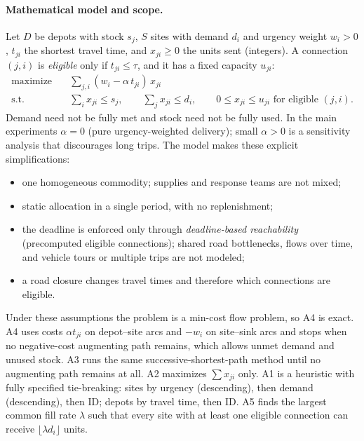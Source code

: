 \documentclass[11pt]{article}
\begin{document}
\paragraph{Mathematical model and scope.}
Let $D$ be depots with stock $s_j$, $S$ sites with demand $d_i$ and urgency
weight $w_i>0$, $t_{ji}$ the shortest travel time, and $x_{ji}\ge 0$ the
units sent (integers). A connection $(j,i)$ is \emph{eligible} only if
$t_{ji}\le\tau$, and it has a fixed capacity $u_{ji}$:
\begin{align*}
\text{maximize}\quad & \textstyle\sum_{j,i} (w_i - \alpha\, t_{ji})\, x_{ji}\\
\text{s.t.}\quad & \textstyle\sum_i x_{ji} \le s_j,\qquad
                   \sum_j x_{ji} \le d_i,\qquad 0\le x_{ji}\le u_{ji}
                   \text{ for eligible } (j,i).
\end{align*}
Demand need not be fully met and stock need not be fully used. In the main
experiments $\alpha = 0$ (pure urgency-weighted delivery); small $\alpha > 0$
is a sensitivity analysis that discourages long trips. The model makes these
explicit simplifications:
\begin{itemize}
  \item one homogeneous commodity; supplies and response teams are not mixed;
  \item static allocation in a single period, with no replenishment;
  \item the deadline is enforced only through \emph{deadline-based
        reachability} (precomputed eligible connections); shared road
        bottlenecks, flows over time, and vehicle tours or multiple trips are
        not modeled;
  \item a road closure changes travel times and therefore which connections
        are eligible.
\end{itemize}
Under these assumptions the problem is a min-cost flow problem, so A4 is
exact. A4 uses costs $\alpha t_{ji}$ on depot--site arcs and $-w_i$ on
site--sink arcs and stops when no negative-cost augmenting path remains, which
allows unmet demand and unused stock. A3 runs the same successive-shortest-path
method until no augmenting path remains at all. A2 maximizes $\sum x_{ji}$
only. A1 is a heuristic with fully specified tie-breaking: sites by urgency
(descending), then demand (descending), then ID; depots by travel time, then
ID. A5 finds the largest common fill rate $\lambda$ such that every site with
at least one eligible connection can receive $\lfloor \lambda d_i \rfloor$
units.
\end{document}
